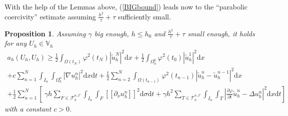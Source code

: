 \documentclass[11pt,a4paper]{article}
\theoremstyle{plain}
\newtheorem{proposition}[theorem]{Proposition}%
\theoremstyle{definition}
\theoremstyle{remark}
\numberwithin{equation}{section}
\newcommand{\dx}{\mathrm{d}x}
\newcommand{\dsigma}{\mathrm{d}\sigma}
\newcommand{\dt}{\mathrm{d}t}
\begin{document}
With the help of the Lemmas above, (\ref{BIGbound}) leads now to the ``parabolic coercivity'' estimate assuming $\frac{h^2}{\tau}+\tau$ sufficiently small.

\begin{proposition}\label{coerc}
Assuming $\gamma$ big enough, $h\leqslant h_0$ and $\frac{h^2}{\tau}+\tau$ small  enough, it holds for any $U_h\in\mathbb{V}_h$
  \begin{multline*}
       a_h (U_h, U_h) \geqslant \frac{1}{2}  \int_{\Omega (t_N)} \varphi^2 (t_N) |
     \tilde{u}_h^N |^2 \dx + \frac{1}{2}  \int_{\Omega_h^0} \varphi^2 (t_0)
     | \tilde{u}_h^1 |^2 \dx \\
   + c \sum_{n = 1}^N \int_{I_n} \int_{\Omega^n_h} | \nabla u^n_h |^2 \dx \dt + \frac{1}{2} \sum_{n = 2}^N  \int_{\Omega (t_{n - 1})} \varphi^2
     (t_{n - 1})  | \tilde{u}_h^n - \tilde{u}_h^{n - 1} |^2 \dx \\
   + \frac{1}{2} \sum_{n = 1}^N \left[ \ \gamma h
   \sum_{F\in\mathcal{F}_h^{n, \Gamma}}  \int_{I_n}\int_{F}[\![\partial_\nu u^n_h]\!]^2 \dsigma \dt + \gamma h^2 \sum_{T\in\mathcal{T}_h^{n,\Gamma}} \int_{I_n} \int_{T}
     \left| \frac{\partial \varphi}{\partial t}  \tilde{u}^n_h - \Delta u^n_h
     \right|^2 \dx \dt \right]
  \end{multline*}
  with a constant $c > 0$.
\end{proposition}
\end{document}
